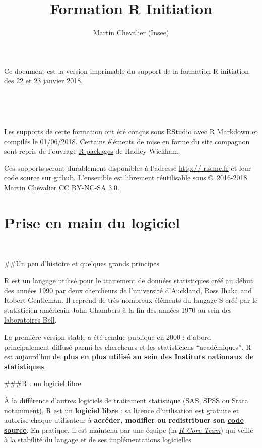 \documentclass[12pt,twosided, notitlepage]{book}
\title{Formation R Initiation}
\author{Martin Chevalier (Insee)}
\date{}
\makeatletter
\newcommand*{\toccontents}{\@starttoc{toc}}
\newif \ifsol
\makeatother
\begin{document}
\maketitle

\thispagestyle{empty}

Ce document est la version imprimable du support de la formation R
initiation des 22 et 23 janvier 2018.

~

\toccontents

~

Les supports de cette formation ont été conçus sous RStudio avec
\href{http://rmarkdown.rstudio.com/}{R Markdown} et compilés le
01/06/2018. Certains éléments de mise en forme du site compagnon sont
repris de l'ouvrage \href{http://r-pkgs.had.co.nz/}{R packages} de
Hadley Wickham.

Ces supports seront durablement disponibles à l'adresse
\href{http://r.slmc.fr/}{http:// r.slmc.fr} et leur code source sur
\href{https://github.com/martinchevalier/r_insee}{github}. L'ensemble
est librement réutilisable sous ©~2016-2018 Martin Chevalier
\href{https://creativecommons.org/licenses/by-nc-sa/3.0/fr}{CC BY-NC-SA
3.0}.

\renewcommand{\cftsecfont}{\small\bfseries}

\solfalse

\chapter{Prise en main du logiciel}
 \minitoc

~

\#\#Un peu d'histoire et quelques grands principes

R est un langage utilisé pour le traitement de données statistiques créé
au début des années 1990 par deux chercheurs de l'université d'Auckland,
Ross Ihaka and Robert Gentleman. Il reprend de très nombreux éléments du
langage S créé par le statisticien américain John Chambers à la fin des
années 1970 au sein des
\href{https://fr.wikipedia.org/wiki/Laboratoires_Bell}{laboratoires
Bell}.

La première version stable a été rendue publique en 2000 : d'abord
principalement diffusé parmi les chercheurs et les statisticiens
\enquote{académiques}, R est aujourd'hui \textbf{de plus en plus utilisé
au sein des Instituts nationaux de statistiques}.

\#\#\#R : un logiciel libre

À la différence d'autres logiciels de traitement statistique (SAS, SPSS
ou Stata notamment), R est un \textbf{logiciel libre} : sa licence
d'utilisation est gratuite et autorise chaque utilisateur à
\textbf{accéder, modifier ou redistribuer son
\href{https://github.com/wch/r-source}{code source}}. En pratique, il
est maintenu par une équipe (la
\emph{\href{https://www.r-project.org/contributors.html}{R Core Team}})
qui veille à la stabilité du langage et de ses implémentations
logicielles.
\end{document}
